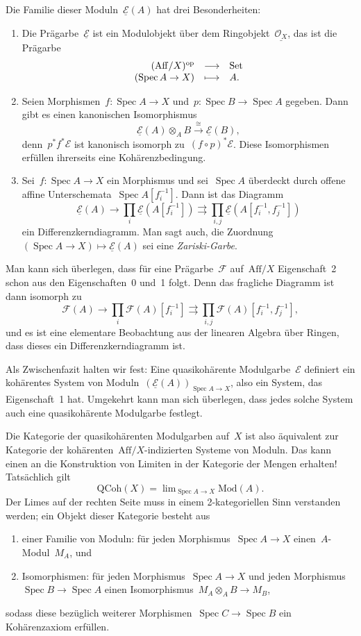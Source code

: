 \documentclass[a4paper,ngerman,12pt]{scrartcl}
\theoremstyle{definition}
\theoremstyle{plain}
\theoremstyle{remark}
\newcommand{\E}{\mathcal{E}}
\newcommand{\F}{\mathcal{F}}
\renewcommand{\O}{\mathcal{O}}
\newcommand{\op}{\mathrm{op}}
\newcommand{\Set}{\mathrm{Set}}
\newcommand{\ul}[1]{\underline{#1}}
\newcommand{\lra}{\longrightarrow}
\DeclareMathOperator{\Spec}{Spec}
\begin{document}
Die Familie dieser Moduln~$\ul{\E}(A)$ hat drei Besonderheiten:
\begin{enumerate}
\addtocounter{enumi}{-1}
\item Die Prägarbe~$\ul{\E}$ ist ein Modulobjekt über dem
Ringobjekt~$\ul{\O_X}$, das ist die Prägarbe
\[ \begin{array}{@{}rcl@{}}
  (\mathrm{Aff}/X)^\op &\lra& \Set \\
  (\Spec A \to X) &\longmapsto& A.
\end{array} \]
\item Seien Morphismen~$f : \Spec A \to X$ und~$p : \Spec B \to \Spec A$ gegeben. Dann
gibt es einen kanonischen Isomorphismus
\[ \ul{\E}(A) \otimes_A B \stackrel{\cong}{\lra} \ul{\E}(B), \]
denn~$p^* f^* \E$ ist kanonisch isomorph zu~$(f \circ p)^*\E$.
Diese Isomorphismen erfüllen ihrerseits eine Kohärenzbedingung.

\item Sei~$f : \Spec A \to X$ ein Morphismus und sei~$\Spec A$ überdeckt durch
offene affine Unterschemata~$\Spec A[f_i^{-1}]$. Dann ist das Diagramm
\[ \ul{\E}(A) \to \prod_i \ul{\E}(A[f_i^{-1}]) \rightrightarrows \prod_{i,j}
\ul{\E}(A[f_i^{-1},f_j^{-1}]) \]
ein Differenzkerndiagramm. Man sagt auch, die Zuordnung~$(\Spec A \to X)
\mapsto \ul{\E}(A)$ sei eine \emph{Zariski-Garbe}.
\end{enumerate}

Man kann sich überlegen, dass für eine Prägarbe~$\F$ auf~$\mathrm{Aff}/X$
Eigenschaft~2 schon aus den Eigenschaften~0 und~1 folgt. Denn das fragliche Diagramm ist
dann isomorph zu
\[ \F(A) \to \prod_i \F(A)[f_i^{-1}] \rightrightarrows \prod_{i,j}
\F(A)[f_i^{-1},f_j^{-1}], \]
und es ist eine elementare Beobachtung aus der linearen Algebra über Ringen,
dass dieses ein Differenzkerndiagramm ist.

Als Zwischenfazit halten wir fest: Eine quasikohärente Modulgarbe~$\E$
definiert ein kohärentes System von Moduln~$(\ul{\E}(A))_{\Spec A \to X}$, also ein
System, das Eigenschaft~1 hat. Umgekehrt kann man sich überlegen, dass jedes
solche System auch eine quasikohärente Modulgarbe festlegt.

Die Kategorie der quasikohärenten Modulgarben auf~$X$ ist also äquivalent zur
Kategorie der kohärenten~$\mathrm{Aff}/X$-indizierten Systeme von Moduln. Das kann
einen an die Konstruktion von Limiten in der Kategorie der Mengen erhalten!
Tatsächlich gilt
\[ \mathrm{QCoh}(X) = \lim\nolimits_{\Spec A \to X} \mathrm{Mod}(A). \]
Der Limes auf der rechten Seite muss in einem 2-kategoriellen Sinn verstanden
werden; ein Objekt dieser Kategorie besteht aus
\begin{enumerate}
\item einer Familie von Moduln: für jeden Morphismus~$\Spec A \to X$
einen~$A$-Modul~$M_A$, und
\item Isomorphismen: für jeden Morphismus~$\Spec A \to X$ und jeden
Morphismus~$\Spec B \to \Spec A$ einen Isomorphismus~$M_A \otimes_A B \to
M_B$,
\end{enumerate}
sodass diese bezüglich weiterer Morphismen~$\Spec C \to \Spec B$ ein
Kohärenzaxiom erfüllen.
\end{document}
